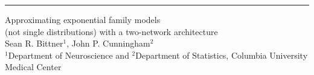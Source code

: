 \documentclass[landscape]{article}
\begin{document}
\color{black}

\hrule width 0pt depth 0pt height 1pt

\begin{center}
  \HUGE
Approximating exponential family models \\ (not single distributions) with a two-network architecture \\
  \huge %
  Sean R. Bittner$^{1}$, John P. Cunningham$^2$ \\
  \LARGE
  $^{1}$Department of Neuroscience and $^{2}$Department of Statistics, Columbia University Medical Center
\end{center}

\end{document}
